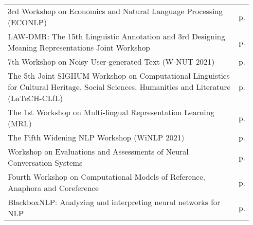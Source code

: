 \begin{center}
\begin{tabular}{@{}%
  >{\raggedright\arraybackslash}p{}
  >{\raggedleft\arraybackslash}p{}}
  \multicolumn{2}{l}{\hspace{-1mm}\large Thursday} \\
  \hline
3rd Workshop on Economics and Natural Language Processing (ECONLP) & p.\pageref{WShopO} \\
LAW-DMR: The 15th Linguistic Annotation and 3rd Designing Meaning Representations Joint Workshop & p.\pageref{WShopP} \\
7th Workshop on Noisy User-generated Text (W-NUT 2021) & p.\pageref{WShopQ} \\
The 5th Joint SIGHUM Workshop on Computational Linguistics for Cultural Heritage, Social Sciences, Humanities and Literature (LaTeCH-CLfL) & p.\pageref{WShopR} \\
The 1st Workshop on Multi-lingual Representation Learning (MRL) & p.\pageref{WShopS} \\
The Fifth Widening NLP Workshop (WiNLP 2021) & p.\pageref{WShopT} \\
Workshop on Evaluations and Assessments of Neural Conversation Systems & p.\pageref{WShopU} \\
Fourth Workshop on Computational Models of Reference, Anaphora and Coreference  & p.\pageref{WShopV} \\
BlackboxNLP: Analyzing and interpreting neural networks for NLP & p.\pageref{WShopW} \\

\end{tabular}
\end{center}
